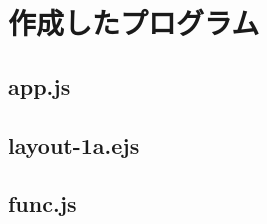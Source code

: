 \appendix
\section{作成したプログラム}

\subsection{app.js}
\label{app.js}
\newpage

\subsection{layout-1a.ejs}
\label{layout-1a.ejs}
\newpage

\subsection{func.js}
\label{func.js}
\newpage